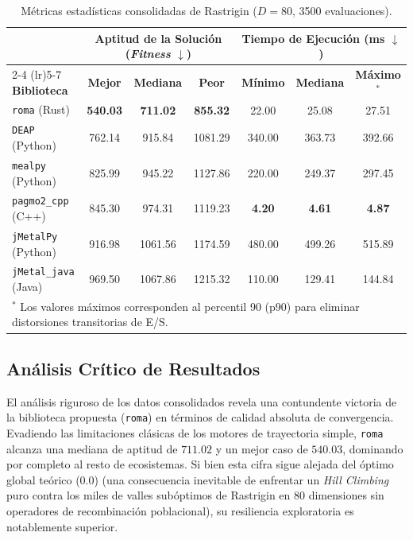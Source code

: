 \documentclass[12pt,a4paper,twoside,openright]{book}
\begin{document}
\begin{table}[htbp]
\centering
\small
\begin{tabular}{l ccc ccc}
\toprule
& \multicolumn{3}{c}{\textbf{Aptitud de la Solución (\textit{Fitness} $\downarrow$)}} & \multicolumn{3}{c}{\textbf{Tiempo de Ejecución (ms $\downarrow$)}} \\
\cmidrule(lr){2-4} \cmidrule(lr){5-7}
\textbf{Biblioteca} & \textbf{Mejor} & \textbf{Mediana} & \textbf{Peor} & \textbf{Mínimo} & \textbf{Mediana} & \textbf{Máximo$^*$} \\
\midrule
\texttt{roma} (Rust)         & \textbf{540.03} & \textbf{711.02} & \textbf{855.32} & 22.00 & 25.08 & 27.51 \\
\texttt{DEAP} (Python)        & 762.14 & 915.84 & 1081.29 & 340.00 & 363.73 & 392.66 \\
\texttt{mealpy} (Python)      & 825.99 & 945.22 & 1127.86 & 220.00 & 249.37 & 297.45 \\
\texttt{pagmo2\_cpp} (C++)    & 845.30 & 974.31 & 1119.23 & \textbf{4.20} & \textbf{4.61} & \textbf{4.87} \\
\texttt{jMetalPy} (Python)    & 916.98 & 1061.56 & 1174.59 & 480.00 & 499.26 & 515.89 \\
\texttt{jMetal\_java} (Java)  & 969.50 & 1067.86 & 1215.32 & 110.00 & 129.41 & 144.84 \\
\bottomrule
\multicolumn{7}{l}{\scriptsize $^*$ Los valores máximos corresponden al percentil 90 (p90) para eliminar distorsiones transitorias de E/S.}
\end{tabular}
\caption{Métricas estadísticas consolidadas de Rastrigin ($D=80$, 3500 evaluaciones).}
\label{tab:resultados_rastrigin}
\end{table}

\subsection{Análisis Crítico de Resultados}
    El análisis riguroso de los datos consolidados revela una contundente victoria de la biblioteca propuesta (\texttt{roma}) en términos de calidad absoluta de convergencia. Evadiendo las limitaciones clásicas de los motores de trayectoria simple, \texttt{roma} alcanza una mediana de aptitud de $711.02$ y un mejor caso de $540.03$, dominando por completo al resto de ecosistemas. Si bien esta cifra sigue alejada del óptimo global teórico ($0.0$) (una consecuencia inevitable de enfrentar un \textit{Hill Climbing} puro contra los miles de valles subóptimos de Rastrigin en 80 dimensiones sin operadores de recombinación poblacional), su resiliencia exploratoria es notablemente superior.
\end{document}
